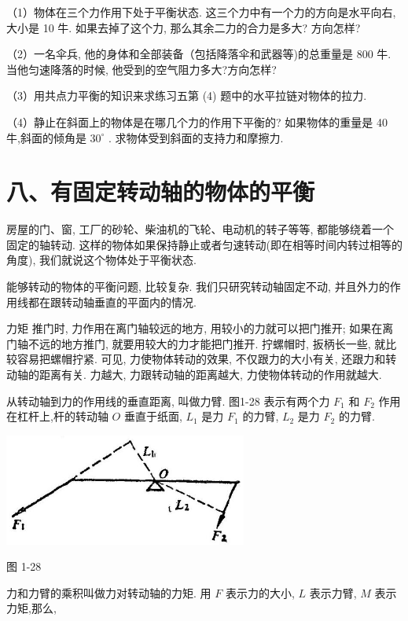 \documentclass[10pt]{article}
\begin{document}
（1）物体在三个力作用下处于平衡状态. 这三个力中有一个力的方向是水平向右, 大小是 10 牛. 如果去掉了这个力, 那么其余二力的合力是多大? 方向怎样?

（2）一名伞兵, 他的身体和全部装备（包括降落伞和武器等)的总重量是 800 牛. 当他匀速降落的时候, 他受到的空气阻力多大?方向怎样?

（3）用共点力平衡的知识来求练习五第 (4) 题中的水平拉链对物体的拉力.

（4）静止在斜面上的物体是在哪几个力的作用下平衡的? 如果物体的重量是 40 牛,斜面的倾角是 \({30}^{ \circ }\) . 求物体受到斜面的支持力和摩擦力.

\section*{八、有固定转动轴的物体的平衡}

房屋的门、窗, 工厂的砂轮、柴油机的飞轮、电动机的转子等等, 都能够绕着一个固定的轴转动. 这样的物体如果保持静止或者匀速转动(即在相等时间内转过相等的角度), 我们就说这个物体处于平衡状态.

能够转动的物体的平衡问题, 比较复杂. 我们只研究转动轴固定不动, 并且外力的作用线都在跟转动轴垂直的平面内的情况.

力矩 推门时, 力作用在离门轴较远的地方, 用较小的力就可以把门推开; 如果在离门轴不远的地方推门, 就要用较大的力才能把门推开. 拧螺帽时, 扳柄长一些, 就比较容易把螺帽拧紧. 可见, 力使物体转动的效果, 不仅跟力的大小有关, 还跟力和转动轴的距离有关. 力越大, 力跟转动轴的距离越大, 力使物体转动的作用就越大.

从转动轴到力的作用线的垂直距离, 叫做力臂. 图1-28 表示有两个力 \({F}_{1}\) 和 \({F}_{2}\) 作用在杠杆上,杆的转动轴 \(O\) 垂直于纸面, \({L}_{1}\) 是力 \({F}_{1}\) 的力臂, \({L}_{2}\) 是力 \({F}_{2}\) 的力臂.

\begin{center}
\includegraphics[max width=0.6\textwidth]{images/01912d55-147c-70aa-b0e0-1782a122f948_41_796144.jpg}
\end{center}

图 1-28

力和力臂的乘积叫做力对转动轴的力矩. 用 \(F\) 表示力的大小, \(L\) 表示力臂, \(M\) 表示力矩,那么,
\end{document}
